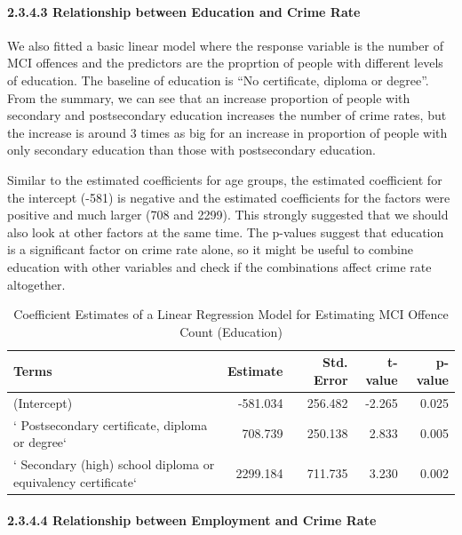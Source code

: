 \documentclass[
]{article}
\begin{document}
\hypertarget{relationship-between-education-and-crime-rate}{%
\paragraph{2.3.4.3 Relationship between Education and Crime
Rate}\label{relationship-between-education-and-crime-rate}}

We also fitted a basic linear model where the response variable is the
number of MCI offences and the predictors are the proprtion of people
with different levels of education. The baseline of education is ``No
certificate, diploma or degree''. From the summary, we can see that an
increase proportion of people with secondary and postsecondary education
increases the number of crime rates, but the increase is around 3 times
as big for an increase in proportion of people with only secondary
education than those with postsecondary education.

Similar to the estimated coefficients for age groups, the estimated
coefficient for the intercept (-581) is negative and the estimated
coefficients for the factors were positive and much larger (708 and
2299). This strongly suggested that we should also look at other factors
at the same time. The p-values suggest that education is a significant
factor on crime rate alone, so it might be useful to combine education
with other variables and check if the combinations affect crime rate
altogether.

\begin{table}

\caption{\label{tab:crime-vs-education-lm}Coefficient Estimates of a Linear Regression Model for Estimating MCI Offence Count (Education)}
\centering
\begin{tabular}[t]{l|r|r|r|r}
\hline
Terms & Estimate & Std. Error & t-value & p-value\\
\hline
(Intercept) & -581.034 & 256.482 & -2.265 & 0.025\\
\hline
`  Postsecondary certificate, diploma or degree` & 708.739 & 250.138 & 2.833 & 0.005\\
\hline
`  Secondary (high) school diploma or equivalency certificate` & 2299.184 & 711.735 & 3.230 & 0.002\\
\hline
\end{tabular}
\end{table}

\hypertarget{relationship-between-employment-and-crime-rate}{%
\paragraph{2.3.4.4 Relationship between Employment and Crime
Rate}\label{relationship-between-employment-and-crime-rate}}
\end{document}
